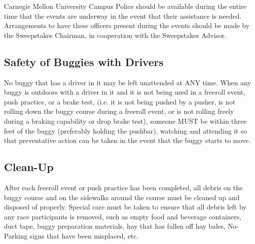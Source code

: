 	Carnegie Mellon University Campus Police should be available during the entire
	time that the events are underway in the event that their assistance is needed.
	Arrangements to have these officers present during the events should be made by
	the Sweepstakes Chairman, in cooperation with the Sweepstakes Advisor.
	
	
\subsection{Safety of Buggies with Drivers}
\label{ssec:SafetyBuggyDriver}
	No buggy that has a driver in it may be left unattended at ANY time. When any
	buggy is outdoors with a driver in it and it is not being used in a freeroll
	event, push practice, or a brake test, (i.e. it is not being pushed by a pusher, 
	is not rolling down the buggy course during a freeroll event, or is 
	not rolling freely during a braking capability or drop brake test), someone MUST 
	be within three feet of the buggy (preferably holding the pushbar), watching and
	attending it so that preventative action can be taken in the event that the
	buggy starts to move.
	
	
\subsection{Clean-Up}
\label{ssec:CleanUp}
	After each freeroll event or push practice has been completed, all debris 
	on the buggy course and on the sidewalks around the course must be cleaned up 
	and disposed of properly. Special care must be taken to ensure that all debris 
	left by any race participants is removed, such as empty food and beverage
	containers, duct tape, buggy preparation materials, hay that has fallen off hay
	bales, No-Parking signs that have been misplaced, etc.